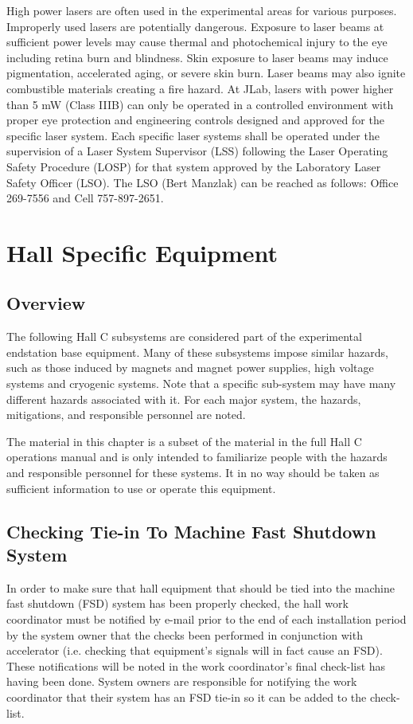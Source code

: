 	High power lasers are often used in the experimental areas for various purposes. Improperly 
used lasers are potentially dangerous. Exposure to laser beams at sufficient power levels 
may cause thermal and photochemical injury to the eye including retina burn and blindness. 
Skin exposure to laser beams may induce pigmentation, accelerated aging, or severe skin burn. 
Laser beams may also ignite combustible materials creating a fire hazard. At JLab, lasers with power 
higher than 5 mW (Class IIIB) can only be operated in a controlled environment with proper eye protection 
and engineering controls designed and approved for the specific laser system. Each specific laser systems 
shall be operated under the supervision of a Laser System Supervisor (LSS) following the Laser 
Operating Safety Procedure (LOSP) for that system approved by the Laboratory Laser Safety Officer (LSO). 
The LSO (Bert Manzlak) can be reached as follows: Office 269-7556 and Cell 757-897-2651.

%
%
\chapter{Hall Specific Equipment}

\section{Overview}

        The following Hall C subsystems are considered part of the experimental endstation base equipment.
Many of these subsystems impose similar hazards, such as those induced by magnets and magnet power supplies,
high voltage systems and cryogenic systems.  Note that a specific sub-system may have many different hazards associated with it.
For each major system, the hazards, mitigations, and responsible personnel are noted.

The material in this chapter is a subset of the material in the full Hall C operations manual and is only intended to familiarize
people with the hazards and responsible personnel for these systems.  It in no way should be taken as sufficient information to
use or operate this equipment.

\section{Checking Tie-in To Machine Fast Shutdown System}

In order to make sure that hall equipment that should be tied into the machine fast shutdown (FSD) system
has been properly checked, the hall work coordinator must be notified by e-mail prior to the end of each
installation period by the system owner
that the checks been performed in conjunction with accelerator (i.e. checking that equipment's signals
will in fact cause an FSD).  These notifications will be
noted in the work coordinator's final check-list has having been done.   System owners are responsible
for notifying the work coordinator that their system has an FSD tie-in so it can be added to the check-list.


%
%

